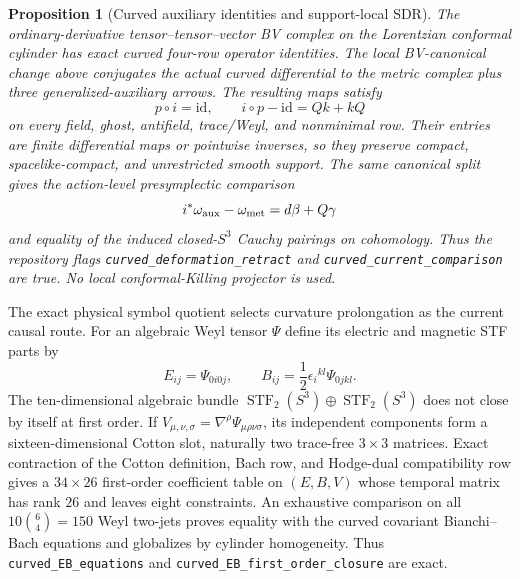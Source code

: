 \documentclass[11pt]{article}
\newtheorem{proposition}[theorem]{Proposition}
\theoremstyle{definition}
\theoremstyle{remark}
\newcommand{\id}{\mathrm{id}}
\begin{document}
\begin{proposition}[Curved auxiliary identities and support-local SDR]
\label{thm:auxiliary-green-witness}
The ordinary-derivative tensor--tensor--vector BV complex on the Lorentzian
conformal cylinder has exact curved four-row operator identities.  The local
BV-canonical change above conjugates the actual curved differential to the
metric complex plus three generalized-auxiliary arrows.  The resulting maps
satisfy
\begin{equation}
 p\circ i=\id,\qquad i\circ p-\id=Qk+kQ
\end{equation}
on every field, ghost, antifield, trace/Weyl, and nonminimal row.  Their
entries are finite differential maps or pointwise inverses, so they preserve
compact, spacelike-compact, and unrestricted smooth support.  The same
canonical split gives the action-level presymplectic comparison
\begin{equation}
 i^*\omega_{\rm aux}-\omega_{\rm met}=d\beta+Q\gamma
\end{equation}
and equality of the induced closed-$S^3$ Cauchy pairings on cohomology.
Thus the repository flags \texttt{curved\_deformation\_retract} and
\texttt{curved\_current\_comparison} are true.  No local
conformal-Killing projector is used.
\end{proposition}

The exact physical symbol quotient selects curvature prolongation as the
current causal route.  For an algebraic Weyl tensor $\Psi$ define its
electric and magnetic STF parts by
\begin{equation}
 E_{ij}=\Psi_{0i0j},\qquad
 B_{ij}=\frac12\epsilon_i{}^{kl}\Psi_{0jkl}.
\end{equation}
The ten-dimensional algebraic bundle
$\operatorname{STF}_2(S^3)\oplus\operatorname{STF}_2(S^3)$ does not close by
itself at first order.  If
\(V_{\mu,\nu,\sigma}=\nabla^\rho\Psi_{\mu\rho\nu\sigma}\), its independent
components form a sixteen-dimensional Cotton slot, naturally two trace-free
$3\times3$ matrices.  Exact contraction of the Cotton definition, Bach row,
and Hodge-dual compatibility row gives a $34\times26$ first-order coefficient
table on $(E,B,V)$ whose temporal matrix has rank $26$ and leaves eight
constraints.  An exhaustive comparison on all
$10\binom{6}{4}=150$ Weyl two-jets proves equality with the curved covariant
Bianchi--Bach equations and globalizes by cylinder homogeneity.  Thus
\texttt{curved\_EB\_equations} and
\texttt{curved\_EB\_first\_order\_closure} are exact.
\end{document}
